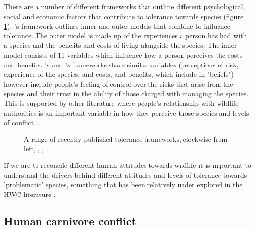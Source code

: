 There are a number of different frameworks that outline different psychological, social and economic factors that contribute to tolerance towards species (figure \ref{fig:A_toleranceframe}). \citet{Kansky2016}'s framework outlines inner and outer models that combine to influence tolerance. The outer model is made up of the experiences a person has had with a species and the benefits and costs of living alongside the species. The inner model consists of 11 variables which influence how a person perceives the costs and benefits. \citet{Bruskotter2014d}'s and \citet{Inskip2016}'s frameworks share similar variables (perceptions of risk; experience of the species; and costs, and benefits, which \citet{Inskip2016} include in "beliefs") however \citet{Bruskotter2014d} include people's feeling of control over the risks that arise from the species and their trust in the ability of those charged with managing the species. This is supported by other literature where people's relationship with wildlife authorities is an important variable in how they perceive those species and levels of conflict \citep{Dickman2010b}.\\

\begin{figure}[htb]
\centering
\setlength\fboxsep{0pt}
\setlength\fboxrule{1pt}
\caption{A range of recently published tolerance frameworks, clockwise from left, \citet{Inskip2016}, \citet{Bruskotter2014d}, \citet{Kansky2016}.}
\label{fig:A_toleranceframe}
\end{figure}

If we are to reconcile different human attitudes towards wildlife it is important to understand the drivers behind different attitudes and levels of tolerance towards 'problematic' species, something that has been relatively under explored in the HWC literature \citep{Dickman2010b}.\\

\subsection{Human carnivore conflict}

